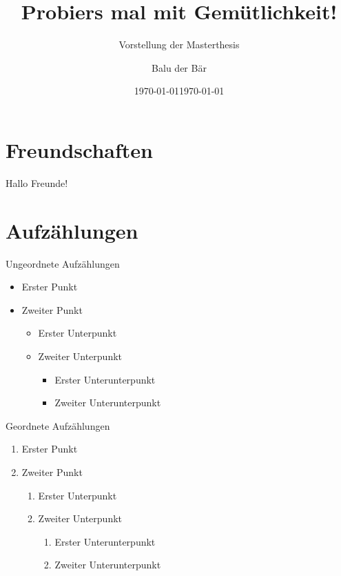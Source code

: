 \documentclass[aspectratio=1610]{beamer}
\title{Probiers mal mit Gemütlichkeit!}
\subtitle{Vorstellung der Masterthesis}
\date{\today}
\author{Balu der Bär}
\institute{Universität Klagenfurt}
\date{\today}
\begin{document}
	
\begin{frame}
\titlepage
\end{frame}

\begin{frame}
	\tableofcontents
\end{frame}

\section{Freundschaften}
\begin{frame}
	Hallo Freunde!
\end{frame}

\section{Aufzählungen}
\begin{frame}{Ungeordnete Aufzählungen}
	\begin{itemize}
		\item Erster Punkt
		\item Zweiter Punkt
		\begin{itemize}
			\item Erster Unterpunkt
			\item Zweiter Unterpunkt
			\begin{itemize}
				\item Erster Unterunterpunkt
				\item Zweiter Unterunterpunkt
			\end{itemize}
		\end{itemize}
	\end{itemize}
\end{frame}

\begin{frame}{Geordnete Aufzählungen}
	\begin{enumerate}
		\item Erster Punkt
		\item Zweiter Punkt
		\begin{enumerate}
			\item Erster Unterpunkt
			\item Zweiter Unterpunkt
			\begin{enumerate}
				\item Erster Unterunterpunkt
				\item Zweiter Unterunterpunkt
			\end{enumerate}
		\end{enumerate}
	\end{enumerate}
\end{frame}
\end{document}
